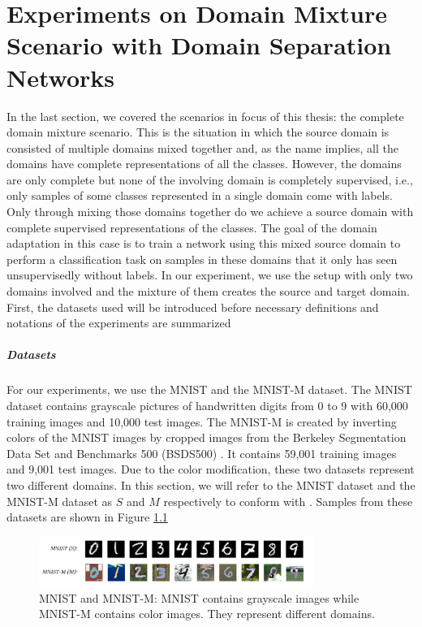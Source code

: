 \chapter{Experiments on Domain Mixture Scenario with Domain Separation Networks} \label{ch:experiment}
In the last section, we covered the scenarios in focus of this thesis: the complete domain mixture scenario. This is the situation in which the source domain is consisted of multiple domains mixed together and, as the name implies, all the domains have complete representations of all the classes. However, the domains are only complete but none of the involving domain is completely supervised, i.e., only samples of some classes represented in a single domain come with labels. Only through mixing those domains together do we achieve a source domain with complete supervised representations of the classes. The goal of the domain adaptation in this case is to train a network using this mixed source domain to perform a classification task on samples in these domains that it only has seen unsupervisedly without labels. In our experiment, we use the setup with only two domains involved and the mixture of them creates the source and target domain. First, the datasets used will be introduced before necessary definitions and notations of the experiments are summarized

\paragraph*{Datasets} For our experiments, we use the MNIST and the MNIST-M dataset. The MNIST \cite{mnist} dataset contains grayscale pictures of handwritten digits from 0 to 9 with 60,000 training images and 10,000 test images. The MNIST-M \cite{mnist-m} is created by inverting colors of the MNIST images by cropped images from the Berkeley Segmentation Data Set and Benchmarks 500 (BSDS500) \cite{bsds500}. It contains 59,001 training images and 9,001 test images. Due to the color modification, these two datasets represent two different domains. In this section, we will refer to the MNIST dataset and the MNIST-M dataset as $S$ and $M$ respectively to conform with \cite{domainMixture}. Samples from these datasets are shown in Figure \ref{fig:mnistmnistm}

\begin{figure}[tbh]
  \centering
  \includegraphics[width=0.8\textwidth]{abbildungen/mnistmnistmText.png}
  \caption{MNIST and MNIST-M: MNIST contains grayscale images while MNIST-M contains color images. They represent different domains.}
  \label{fig:mnistmnistm}
\end{figure}

